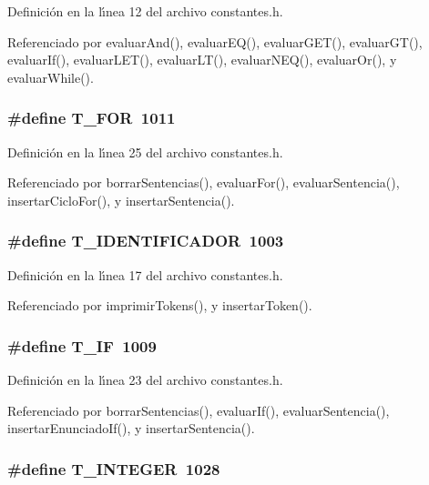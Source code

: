 Definici\'{o}n en la l\'{\i}nea 12 del archivo constantes.h.

Referenciado por evaluar\-And(), evaluar\-EQ(), evaluar\-GET(), evaluar\-GT(), evaluar\-If(), evaluar\-LET(), evaluar\-LT(), evaluar\-NEQ(), evaluar\-Or(), y evaluar\-While().
\subsubsection{\setlength{\rightskip}{0pt plus 5cm}\#define T\_\-FOR~1011}\label{constantes_8h_a14}




Definici\'{o}n en la l\'{\i}nea 25 del archivo constantes.h.

Referenciado por borrar\-Sentencias(), evaluar\-For(), evaluar\-Sentencia(), insertar\-Ciclo\-For(), y insertar\-Sentencia().
\subsubsection{\setlength{\rightskip}{0pt plus 5cm}\#define T\_\-IDENTIFICADOR~1003}\label{constantes_8h_a6}




Definici\'{o}n en la l\'{\i}nea 17 del archivo constantes.h.

Referenciado por imprimir\-Tokens(), y insertar\-Token().
\subsubsection{\setlength{\rightskip}{0pt plus 5cm}\#define T\_\-IF~1009}\label{constantes_8h_a12}




Definici\'{o}n en la l\'{\i}nea 23 del archivo constantes.h.

Referenciado por borrar\-Sentencias(), evaluar\-If(), evaluar\-Sentencia(), insertar\-Enunciado\-If(), y insertar\-Sentencia().
\subsubsection{\setlength{\rightskip}{0pt plus 5cm}\#define T\_\-INTEGER~1028}\label{constantes_8h_a30}




